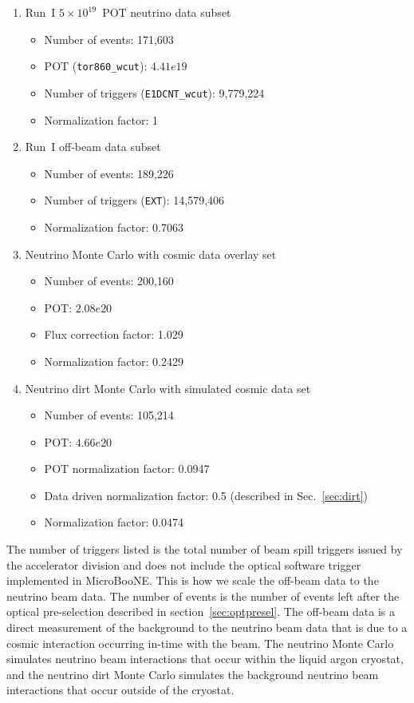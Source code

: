     \begin{enumerate}
      \item Run~I $5\times 10^{19}$~POT neutrino data subset
      \begin{itemize}
        \item Number of events: 171,603
        \item POT (\texttt{tor860\_wcut}): $4.41e19$
        \item Number of triggers (\texttt{E1DCNT\_wcut}): 9,779,224
        \item Normalization factor: 1
      \end{itemize}
      \item Run~I off-beam data subset
      \begin{itemize}
        \item Number of events: 189,226
        \item Number of triggers (\texttt{EXT}): 14,579,406
        \item Normalization factor: 0.7063
      \end{itemize}
      \item Neutrino Monte Carlo with cosmic data overlay set
      \begin{itemize}
        \item Number of events: 200,160
        \item POT: $2.08e20$
        \item Flux correction factor: 1.029
        \item Normalization factor: 0.2429
      \end{itemize}
    \item Neutrino dirt Monte Carlo with simulated cosmic data set
      \begin{itemize}
        \item Number of events: 105,214
        \item POT: $4.66e20$
        \item POT normalization factor: 0.0947
        \item Data driven normalization factor: 0.5 (described in Sec.~\ref{sec:dirt})
        \item Normalization factor: 0.0474
      \end{itemize}
    \end{enumerate}
    The number of triggers listed is the total number of beam spill triggers
    issued by the accelerator division and does not include the optical
    software trigger implemented in MicroBooNE.  This is how we scale the
    off-beam data to the neutrino beam data. The number of events is the number
    of events left after the optical pre-selection described in
    section~\ref{sec:optpresel}. The off-beam data is a direct measurement of
    the background to the neutrino beam data that is due to a cosmic
    interaction occurring in-time with the beam. The neutrino Monte Carlo
    simulates neutrino beam interactions that occur within the liquid argon
    cryostat, and the neutrino dirt Monte Carlo simulates the background
    neutrino beam interactions that occur outside of the cryostat.
    
